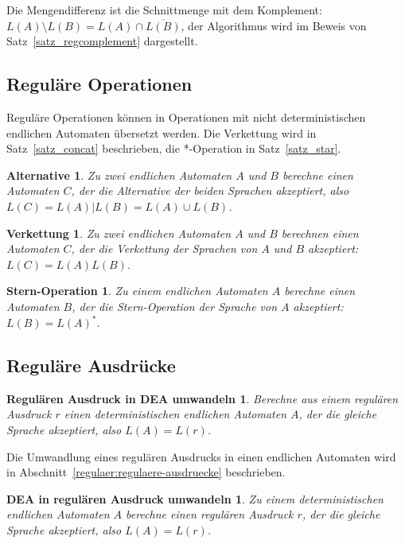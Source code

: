 Die Mengendifferenz ist die Schnittmenge mit dem Komplement:
$L(A)\setminus L(B)=L(A)\cap\overline{L(B)}$, der Algorithmus wird im Beweis
von Satz~\ref{satz_regcomplement} dargestellt.

\subsection{Reguläre Operationen}
Reguläre Operationen können in Operationen mit nicht deterministischen
endlichen Automaten übersetzt werden.
Die Verkettung wird in Satz~\ref{satz_concat} beschrieben, die *-Operation
in Satz~\ref{satz_star}.

\newtheorem*{Alternative}{Alternative}
\begin{Alternative}Zu zwei endlichen Automaten $A$ und $B$ berechne einen
Automaten $C$, der die Alternative der beiden Sprachen akzeptiert, also
$L(C)=L(A)|L(B)=L(A)\cup L(B)$.
\end{Alternative}

\newtheorem*{Verkettung}{Verkettung}
\begin{Verkettung}
Zu zwei endlichen Automaten $A$ und $B$ berechnen einen Automaten $C$,
der die Verkettung der Sprachen von $A$ und $B$ akzeptiert: $L(C)=L(A)L(B)$.
\end{Verkettung}

\newtheorem*{Sternoperation}{Stern-Operation}
\begin{Sternoperation}
Zu einem endlichen Automaten $A$ berechne einen Automaten $B$, der die
Stern-Operation der Sprache von $A$ akzeptiert: $L(B)=L(A)^*$.
\end{Sternoperation}



\subsection{Reguläre Ausdrücke}
\newtheorem*{RegexDea}{Regulären Ausdruck in DEA umwandeln}
\begin{RegexDea} Berechne aus einem regulären Ausdruck $r$ einen 
deterministischen endlichen Automaten $A$, der die gleiche Sprache
akzeptiert, also $L(A)=L(r)$.
\end{RegexDea}

Die Umwandlung eines regulären Ausdrucks in einen endlichen Automaten
wird in Abschnitt~\ref{regulaer:regulaere-ausdruecke} beschrieben.

\newtheorem*{DeaRegex}{DEA in regulären Ausdruck umwandeln}
\begin{DeaRegex}
Zu einem deterministischen endlichen Automaten $A$ berechne einen
regulären Ausdruck $r$, der die gleiche Sprache akzeptiert,
also $L(A)=L(r)$.
\end{DeaRegex}

